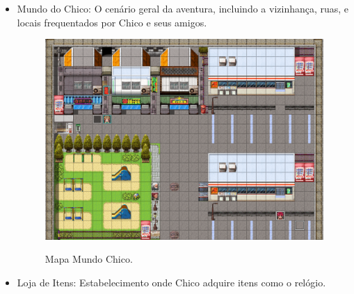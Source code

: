 \newpage

\begin{itemize}
	\item Mundo do Chico: O cenário geral da aventura, incluindo a vizinhança, ruas, e locais frequentados por Chico e seus amigos.

	      \begin{figure}[ht]
		      \centering
		      \caption{Mapa Mundo Chico.}
		      \includegraphics[scale=0.3]{Textuais/Pictures/Mundo_chico.png}
		      \label{fig:mundo-chico}
	      \end{figure}


	\item Loja de Itens: Estabelecimento onde Chico adquire itens como o relógio.


\end{itemize}

